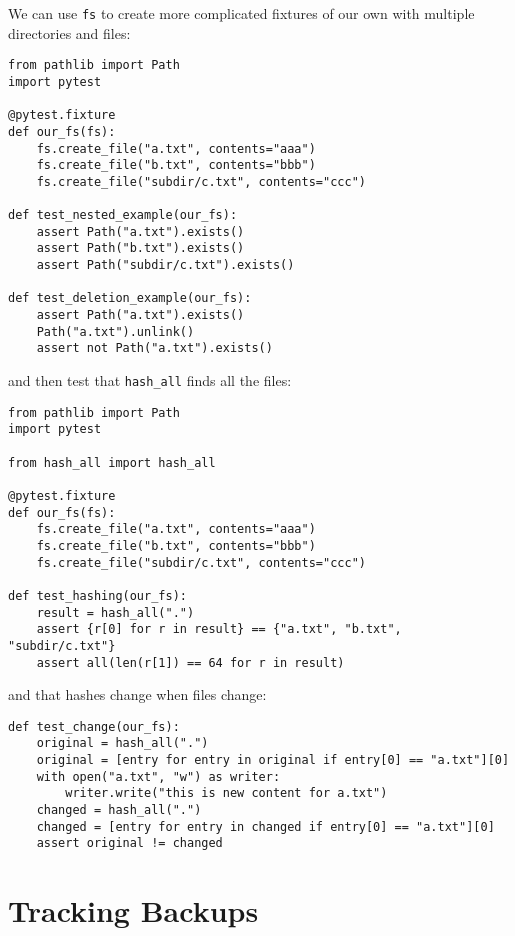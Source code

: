 \documentclass{scrbook}
\begin{document}
We can use \texttt{fs} to create more complicated fixtures of our own
with multiple directories and files:


\begin{lstlisting}[frame=single,frameround=tttt]
from pathlib import Path
import pytest

@pytest.fixture
def our_fs(fs):
    fs.create_file("a.txt", contents="aaa")
    fs.create_file("b.txt", contents="bbb")
    fs.create_file("subdir/c.txt", contents="ccc")

def test_nested_example(our_fs):
    assert Path("a.txt").exists()
    assert Path("b.txt").exists()
    assert Path("subdir/c.txt").exists()

def test_deletion_example(our_fs):
    assert Path("a.txt").exists()
    Path("a.txt").unlink()
    assert not Path("a.txt").exists()
\end{lstlisting}



\noindent and then test that \texttt{hash\_all} finds all the files:


\begin{lstlisting}[frame=single,frameround=tttt]
from pathlib import Path
import pytest

from hash_all import hash_all

@pytest.fixture
def our_fs(fs):
    fs.create_file("a.txt", contents="aaa")
    fs.create_file("b.txt", contents="bbb")
    fs.create_file("subdir/c.txt", contents="ccc")

def test_hashing(our_fs):
    result = hash_all(".")
    assert {r[0] for r in result} == {"a.txt", "b.txt", "subdir/c.txt"}
    assert all(len(r[1]) == 64 for r in result)
\end{lstlisting}



\noindent and that hashes change when files change:


\begin{lstlisting}[frame=single,frameround=tttt]
def test_change(our_fs):
    original = hash_all(".")
    original = [entry for entry in original if entry[0] == "a.txt"][0]
    with open("a.txt", "w") as writer:
        writer.write("this is new content for a.txt")
    changed = hash_all(".")
    changed = [entry for entry in changed if entry[0] == "a.txt"][0]
    assert original != changed
\end{lstlisting}


\section{Tracking Backups}\label{backup-track}
\end{document}
